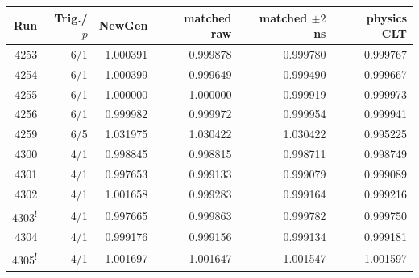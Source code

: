 \begin{tabular}{rrrrrr}\toprule Run & Trig./$p$ & NewGen & matched raw & matched $\pm2$ ns & physics CLT\\\midrule
4253 & 6/1 & 1.000391 & 0.999878 & 0.999780 & 0.999767\\
4254 & 6/1 & 1.000399 & 0.999649 & 0.999490 & 0.999667\\
4255 & 6/1 & 1.000000 & 1.000000 & 0.999919 & 0.999973\\
4256 & 6/1 & 0.999982 & 0.999972 & 0.999954 & 0.999941\\
4259 & 6/5 & 1.031975 & 1.030422 & 1.030422 & 0.995225\\
4300 & 4/1 & 0.998845 & 0.998815 & 0.998711 & 0.998749\\
4301 & 4/1 & 0.997653 & 0.999133 & 0.999079 & 0.999089\\
4302 & 4/1 & 1.001658 & 0.999283 & 0.999164 & 0.999216\\
4303\textsuperscript{!} & 4/1 & 0.997665 & 0.999863 & 0.999782 & 0.999750\\
4304 & 4/1 & 0.999176 & 0.999156 & 0.999134 & 0.999181\\
4305\textsuperscript{!} & 4/1 & 1.001697 & 1.001647 & 1.001547 & 1.001597\\
\bottomrule\end{tabular}